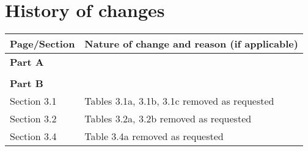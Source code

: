 \section*{History of changes}

\begin{tabular}{|l|l|}
\hline
\textbf{Page/Section} & \textbf{Nature of change and reason (if applicable)} \tabularnewline
\hline
\multicolumn{2}{|l|}{\textbf{Part A}} \\
\hline
 & \\
\hline
\multicolumn{2}{|l|}{\textbf{Part B}} \\
\hline
Section 3.1 & Tables 3.1a, 3.1b, 3.1c removed as requested \\
\hline
Section 3.2 & Tables 3.2a, 3.2b removed as requested \\
\hline
Section 3.4 & Table 3.4a removed as requested \\
\hline
\end{tabular}